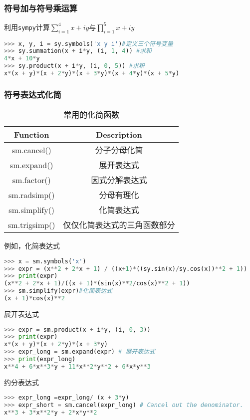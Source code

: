 \subsubsection{符号加与符号乘运算}
利用\verb|sympy|计算$\sum_{i=1}^4{x+iy}$与$\prod_{i=1}^5{x+iy}$
\begin{lstlisting}[language=python]
>>> x, y, i = sy.symbols('x y i')#定义三个符号变量
>>> sy.summation(x + i*y, (i, 1, 4)) #求和
4*x + 10*y
>>> sy.product(x + i*y, (i, 0, 5)) #求积
x*(x + y)*(x + 2*y)*(x + 3*y)*(x + 4*y)*(x + 5*y)
\end{lstlisting}

\subsubsection{符号表达式化简}
\begin{table}[ht]
\centering
\caption{常用的化简函数}\label{SymPy_tab1}
\begin{tabular}{c|c}
Function &Description \\
\hline
sm.cancel() &分子分母化简 \\
\hline
sm.expand() &展开表达式\\
\hline
sm.factor() &因式分解表达式\\
\hline
sm.radsimp() &分母有理化\\
\hline
sm.simplify() &化简表达式\\
\hline
sm.trigsimp() &仅仅化简表达式的三角函数部分\\
\hline
\end{tabular}
\end{table}

例如，化简表达式
\begin{lstlisting}[language=python]
>>> x = sm.symbols('x')
>>> expr = (x**2 + 2*x + 1) / ((x+1)*((sy.sin(x)/sy.cos(x))**2 + 1))
>>> print(expr)
(x**2 + 2*x + 1)/((x + 1)*(sin(x)**2/cos(x)**2 + 1))
>>> sm.simplify(expr)#化简表达式
(x + 1)*cos(x)**2
\end{lstlisting}

展开表达式
\begin{lstlisting}[language=python]
>>> expr = sm.product(x + i*y, (i, 0, 3))
>>> print(expr)
x*(x + y)*(x + 2*y)*(x + 3*y)
>>> expr_long = sm.expand(expr) # 展开表达式
>>> print(expr_long)
x**4 + 6*x**3*y + 11*x**2*y**2 + 6*x*y**3
\end{lstlisting}

约分表达式
\begin{lstlisting}[language=python]
 >>> expr_long =expr_long/ (x + 3*y)
>>> expr_short = sm.cancel(expr_long) # Cancel out the denominator.
x**3 + 3*x**2*y + 2*x*y**2
\end{lstlisting}

